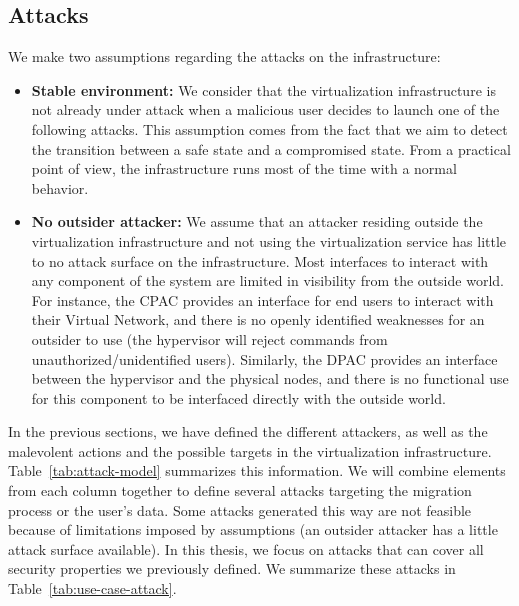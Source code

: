 \subsection{Attacks}
\label{sec:model-attacks}
We make two assumptions regarding the attacks on the infrastructure:

\begin{itemize}
    \item \textbf{Stable environment: } We consider that the virtualization infrastructure is not already under attack when a malicious user decides to launch one of the following attacks.
This assumption comes from the fact that we aim to detect the transition between a safe state and a compromised state. From a practical point of view, the infrastructure runs most of the time with a normal behavior.

    \item \textbf{No outsider attacker: } We assume that an attacker residing outside the virtualization infrastructure and not using the virtualization service has little to no attack surface on the infrastructure.
Most interfaces to interact with any component of the system are limited in visibility from the outside world.
For instance, the CPAC provides an interface for end users to interact with their Virtual Network, and there is no openly identified weaknesses for an outsider to use (\ie the hypervisor will reject commands from unauthorized/unidentified users).
Similarly, the DPAC provides an interface between the hypervisor and the physical nodes, and there is no functional use for this component to be interfaced directly with the outside world. 
\end{itemize}

In the previous sections, we have defined the different attackers, as well as the malevolent actions and the possible targets in the virtualization infrastructure. 
Table~\ref{tab:attack-model} summarizes this information.
We will combine elements from each column together to define several attacks targeting the migration process or the user's data.
Some attacks generated this way are not feasible because of limitations imposed by assumptions (\eg an outsider attacker has a little attack surface available).
In this thesis, we focus on attacks that can cover all security properties we previously defined.
We summarize these attacks in Table~\ref{tab:use-case-attack}.


